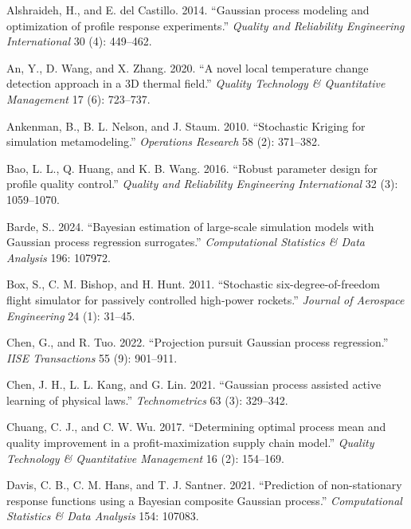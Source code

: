 \documentclass[]{interact}
\theoremstyle{plain}%
\theoremstyle{definition}
\theoremstyle{remark}
\begin{document}
\begin{thebibliography}{}

Alshraideh, H., and E. del Castillo. 2014. ``Gaussian process modeling and optimization of profile response experiments.'' \emph{Quality and Reliability Engineering International} 30 (4): 449--462.

An, Y., D. Wang, and X. Zhang. 2020. ``A novel local temperature change detection approach in a 3D thermal field.'' \emph{Quality Technology \& Quantitative Management} 17 (6): 723--737.

Ankenman, B., B. L. Nelson, and J. Staum. 2010. ``Stochastic Kriging for simulation metamodeling.'' \emph{Operations Research} 58 (2): 371--382.

Bao, L. L., Q. Huang, and K. B. Wang. 2016. ``Robust parameter design for profile quality control.'' \emph{Quality and Reliability Engineering International} 32 (3): 1059--1070.

Barde, S.. 2024. ``Bayesian estimation of large-scale simulation models with Gaussian process regression surrogates.'' \emph{Computational Statistics \& Data Analysis} 196: 107972.

Box, S., C. M. Bishop, and H. Hunt. 2011. ``Stochastic six-degree-of-freedom flight simulator for passively controlled high-power rockets.'' \emph{Journal of Aerospace Engineering} 24 (1): 31--45.

Chen, G., and R. Tuo. 2022. ``Projection pursuit Gaussian process regression.'' \emph{IISE Transactions} 55 (9): 901--911.

Chen, J. H., L. L. Kang, and G. Lin. 2021. ``Gaussian process assisted active learning of physical laws.'' \emph{Technometrics} 63 (3): 329--342.

Chuang, C. J., and C. W. Wu. 2017. ``Determining optimal process mean and quality improvement in a profit-maximization supply chain model.'' \emph{Quality Technology \& Quantitative Management} 16 (2): 154--169.

Davis, C. B., C. M. Hans, and T. J. Santner. 2021. ``Prediction of non-stationary response functions using a Bayesian composite Gaussian process.'' \emph{Computational Statistics \& Data Analysis} 154: 107083.


\end{thebibliography}
\end{document}
